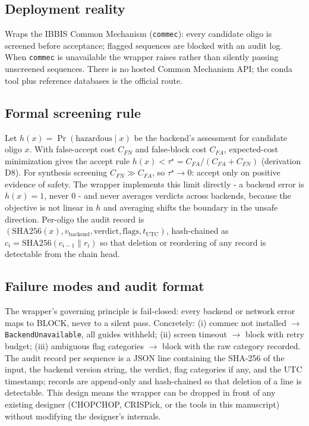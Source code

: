 \documentclass[12pt]{article}
\begin{document}
\subsection{Deployment reality}
Wraps the IBBIS Common Mechanism (\texttt{commec}): every candidate oligo is
screened before acceptance; flagged sequences are blocked with an audit log.
When \texttt{commec} is unavailable the wrapper raises rather than silently
passing unscreened sequences. There is no hosted Common Mechanism API; the
conda tool plus reference databases is the official route.


\subsection{Formal screening rule}
Let $h(x) = \Pr(\text{hazardous} \mid x)$ be the backend's assessment for
candidate oligo $x$. With false-accept cost $C_{FN}$ and false-block cost
$C_{FA}$, expected-cost minimization gives the accept rule
$h(x) < \tau^{\star} = C_{FA}/(C_{FA} + C_{FN})$ (derivation D8). For
synthesis screening $C_{FN} \gg C_{FA}$, so $\tau^{\star} \to 0$: accept
only on positive evidence of safety. The wrapper implements this limit
directly - a backend error is $h(x) = 1$, never $0$ - and never averages
verdicts across backends, because the objective is not linear in $h$ and
averaging shifts the boundary in the unsafe direction. Per-oligo the audit
record is $(\text{SHA256}(x), v_{\text{backend}}, \text{verdict},
\text{flags}, t_{\text{UTC}})$, hash-chained as
$c_i = \text{SHA256}(c_{i-1} \| r_i)$ so that deletion or reordering of
any record is detectable from the chain head.

\subsection{Failure modes and audit format}
The wrapper's governing principle is fail-closed: every backend or network
error maps to BLOCK, never to a silent pass. Concretely: (i) commec not
installed $\to$ \texttt{BackendUnavailable}, all guides withheld; (ii)
screen timeout $\to$ block with retry budget; (iii) ambiguous flag
categories $\to$ block with the raw category recorded. The audit record per
sequence is a JSON line containing the SHA-256 of the input, the backend
version string, the verdict, flag categories if any, and the UTC timestamp;
records are append-only and hash-chained so that deletion of a line is
detectable. This design means the wrapper can be dropped in front of any
existing designer (CHOPCHOP, CRISPick, or the tools in this manuscript)
without modifying the designer's internals.
\end{document}
